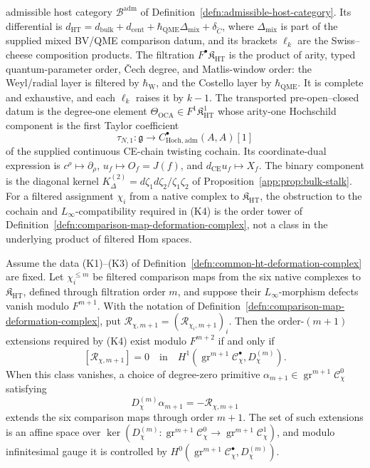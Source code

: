 \begin{defn}
admissible host category \(\mathcal B^{\mathrm{adm}}\) of
Definition~\ref{defn:admissible-host-category}.  Its differential is
\(d_{\mathrm{HT}}=d_{\mathrm{bulk}}+d_{\mathrm{cent}}
+\hbar_{\mathrm{QME}}\Delta_{\mathrm{mix}}+\delta_{\check C}\), where
\(\Delta_{\mathrm{mix}}\) is part of the supplied mixed BV/QME
comparison datum, and its brackets \(\ell_k\) are the Swiss--cheese
composition products.  The filtration
\(F^\bullet\mathfrak K_{\mathrm{HT}}\) is the product of arity,
typed quantum-parameter order, \v Cech degree, and Matlis-window order:
the Weyl/radial layer is filtered by \(\hbar_{\mathrm{W}}\), and the
Costello layer by \(\hbar_{\mathrm{QME}}\).  It is
complete and exhaustive, and each \(\ell_k\) raises it by \(k-1\).  The
transported pre-open--closed datum is the degree-one element
\(\Theta_{\mathrm{OCA}}\in F^1\mathfrak K^1_{\mathrm{HT}}\) whose
arity-one Hochschild component is the first Taylor coefficient
\[
  \tau_{N,1}\colon\mathfrak g\longrightarrow
  C^\bullet_{\mathrm{Hoch},\mathrm{adm}}(A,A)[1]
\]
of the supplied continuous CE-chain twisting cochain.  Its
coordinate-dual expression is
\(c^\rho\mapsto\partial_\rho\),
\(u_f\mapsto O_f=J(f)\), and
\(d_{\mathrm{CE}}u_f\mapsto X_f\).  The binary component is the
diagonal kernel \(K^{(2)}_\Delta=d\zeta_1d\zeta_2/\zeta_1\zeta_2\) of
Proposition~\ref{app:prop:bulk-stalk}.
For a filtered assignment \(\chi_i\) from a native complex to
\(\mathfrak K_{\mathrm{HT}}\), the obstruction to the cochain and
\(L_\infty\)-compatibility required in \textup{(K4)} is the order tower
of
Definition~\ref{defn:comparison-map-deformation-complex}, not a class in
the underlying product of filtered Hom spaces.
\end{defn}

\begin{prop}\label{prop:comparison-map-unification-criterion}
Assume the data \textup{(K1)--(K3)} of
Definition~\ref{defn:common-ht-deformation-complex} are fixed.  Let
\(\chi_i^{\leq m}\) be filtered comparison maps from the six native
complexes to \(\mathfrak K_{\mathrm{HT}}\), defined through filtration
order \(m\), and suppose their \(L_\infty\)-morphism defects vanish
modulo \(F^{m+1}\).  With the notation of
Definition~\ref{defn:comparison-map-deformation-complex}, put
\(\mathcal R_{\chi,m+1}=(\mathcal R_{\chi_i,m+1})_i\).  Then the
order-\((m+1)\) extensions required by
\textup{(K4)} exist modulo \(F^{m+2}\) if and only if
\[
  [\mathcal R_{\chi,m+1}]
  =
  0
  \quad\text{in}\quad
  H^1\!\left(
    \operatorname{gr}^{m+1}\mathcal C^\bullet_{\chi},
    D^{(m)}_{\chi}\right).
\]
When this class vanishes, a choice of degree-zero primitive
\(\alpha_{m+1}\in
\operatorname{gr}^{m+1}\mathcal C^0_{\chi}\) satisfying
\[
  D^{(m)}_{\chi}\alpha_{m+1}
  =
  -\mathcal R_{\chi,m+1}
\]
extends the six comparison maps through order \(m+1\).  The set of such
extensions is an affine space over
\(\ker(D^{(m)}_{\chi}\colon
\operatorname{gr}^{m+1}\mathcal C^0_{\chi}\to
\operatorname{gr}^{m+1}\mathcal C^1_{\chi})\), and modulo infinitesimal
gauge it is controlled by
\(H^0(\operatorname{gr}^{m+1}\mathcal C^\bullet_{\chi},D^{(m)}_{\chi})\).
\end{prop}

